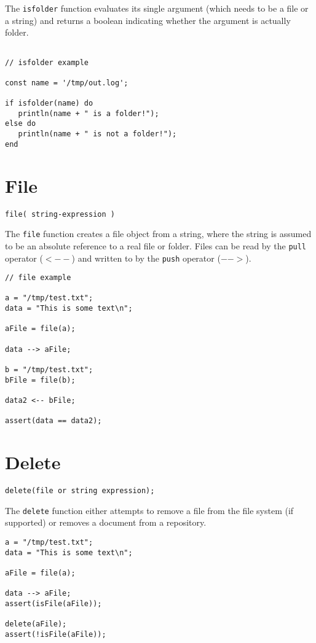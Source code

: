 The \Verb+isfolder+ function evaluates its single argument (which needs to be a file or a string) and returns a boolean indicating whether the argument is actually  folder.

\begin{lstlisting}[caption={IsFolder example}]

// isfolder example

const name = '/tmp/out.log';

if isfolder(name) do
   println(name + " is a folder!");
else do
   println(name + " is not a folder!");
end

\end{lstlisting}

\section{File}
\begin{Verbatim}
file( string-expression )
\end{Verbatim}

The \Verb+file+ function creates a \Reflex file object from a string, where the string is assumed to be an absolute reference to a real file or folder. Files can be read by the \verb+pull+ operator ($<--$) and written to by the \verb+push+ operator ($-->$).

\begin{lstlisting}[caption={File example}]
// file example

a = "/tmp/test.txt";
data = "This is some text\n";

aFile = file(a);

data --> aFile;

b = "/tmp/test.txt";
bFile = file(b);

data2 <-- bFile;

assert(data == data2);
\end{lstlisting}

\section{Delete}
\begin{Verbatim}
delete(file or string expression);
\end{Verbatim}

The \Verb+delete+ function either attempts to remove a file from the file system (if supported) or removes a document from a repository.
\begin{lstlisting}[caption={Delete example}]
a = "/tmp/test.txt";
data = "This is some text\n";

aFile = file(a);

data --> aFile;
assert(isFile(aFile));

delete(aFile);
assert(!isFile(aFile));

\end{lstlisting}
